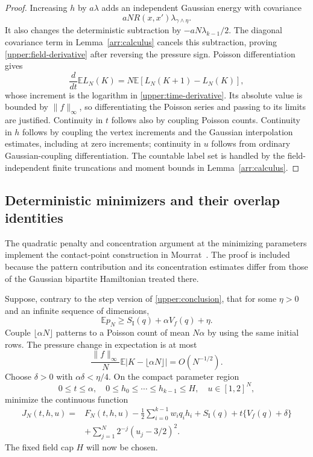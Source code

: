 \begin{proof}
Increasing $h$ by $a\lambda$ adds an independent Gaussian
energy with covariance
\[
 aN R(x,x')\lambda_{\gamma\wedge\eta}.
\]
It also changes the deterministic subtraction by
$-aN\lambda_{k-1}/2$.
The diagonal covariance term in Lemma~\ref{arr:calculus}
cancels this subtraction, proving
\eqref{upper:field-derivative} after reversing the pressure
sign. Poisson differentiation gives
\[
 \frac{d}{dt}\mathbb E L_N(K)
 =N\mathbb E[L_N(K+1)-L_N(K)],
\]
whose increment is the logarithm in
\eqref{upper:time-derivative}. Its absolute value is bounded
by $\|f\|_\infty$, so differentiating the Poisson series
and passing to its limits are justified. Continuity in $t$
follows also by coupling Poisson counts. Continuity in $h$
follows by coupling the vertex increments and the Gaussian
interpolation estimates, including at zero increments;
continuity in $u$ follows from ordinary Gaussian-coupling
differentiation. The countable label set is handled by the
field-independent finite truncations and moment bounds in
Lemma~\ref{arr:calculus}.
\end{proof}

\subsection{Deterministic minimizers and their overlap identities}

The quadratic penalty and concentration argument at the minimizing
parameters implement the contact-point construction in
Mourrat~\cite[Section~4, in particular equations~(4.19)--(4.28)]{mourrat2021}.
The proof is included because the pattern contribution and its
concentration estimates differ from those of the Gaussian bipartite
Hamiltonian treated there.

Suppose, contrary to the step version of
\eqref{upper:conclusion}, that for some $\eta>0$ and an
infinite sequence of dimensions,
\[
 \mathbb E p_N\ge S_{\mathrm I}(q)+\alpha V_f(q)+\eta.
\]
Couple $\lfloor\alpha N\rfloor$ patterns to a Poisson count
of mean $N\alpha$ by using the same initial rows. The pressure
change in expectation is at most
\[
 \frac{\|f\|_\infty}{N}
 \mathbb E|K-\lfloor\alpha N\rfloor|=O(N^{-1/2}).
\]
Choose $\delta>0$ with $\alpha\delta<\eta/4$. On the
compact parameter region
\[
 0\le t\le\alpha,\quad
 0\le h_0\le\cdots\le h_{k-1}\le H,\quad
 u\in[1,2]^N,
\]
minimize the continuous function
\begin{equation}
\label{upper:objective}
 \begin{split}
 J_N(t,h,u)={}&F_N(t,h,u)
       -\frac12\sum_{i=0}^{k-1}w_iq_ih_i
       +S_{\mathrm I}(q)+t\{V_f(q)+\delta\}\\
       &+\sum_{j=1}^N2^{-j}(u_j-3/2)^2.
 \end{split}
\end{equation}
The fixed field cap $H$ will now be chosen.

